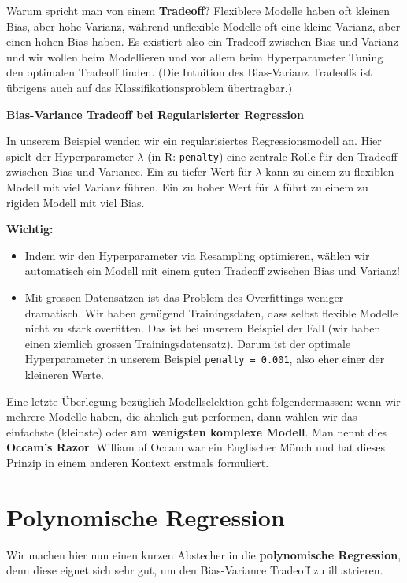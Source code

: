 \documentclass[
]{book}
\providecommand{\tightlist}{%
  \setlength{\itemsep}{0pt}\setlength{\parskip}{0pt}}
\begin{document}
Warum spricht man von einem \textbf{Tradeoff}? Flexiblere Modelle haben oft kleinen Bias, aber hohe Varianz, während unflexible Modelle oft eine kleine Varianz, aber einen hohen Bias haben. Es existiert also ein Tradeoff zwischen Bias und Varianz und wir wollen beim Modellieren und vor allem beim Hyperparameter Tuning den optimalen Tradeoff finden. (Die Intuition des Bias-Varianz Tradeoffs ist übrigens auch auf das Klassifikationsproblem übertragbar.)

\textbf{Bias-Variance Tradeoff bei Regularisierter Regression}

In unserem Beispiel wenden wir ein regularisiertes Regressionsmodell an. Hier spielt der Hyperparameter \(\lambda\) (in R: \texttt{penalty}) eine zentrale Rolle für den Tradeoff zwischen Bias und Variance. Ein zu tiefer Wert für \(\lambda\) kann zu einem zu flexiblen Modell mit viel Varianz führen. Ein zu hoher Wert für \(\lambda\) führt zu einem zu rigiden Modell mit viel Bias.

\textbf{Wichtig:}

\begin{itemize}
\tightlist
\item
  Indem wir den Hyperparameter via Resampling optimieren, wählen wir automatisch ein Modell mit einem guten Tradeoff zwischen Bias und Varianz!
\item
  Mit grossen Datensätzen ist das Problem des Overfittings weniger dramatisch. Wir haben genügend Trainingsdaten, dass selbst flexible Modelle nicht zu stark overfitten. Das ist bei unserem Beispiel der Fall (wir haben einen ziemlich grossen Trainingsdatensatz). Darum ist der optimale Hyperparameter in unserem Beispiel \texttt{penalty\ =\ 0.001}, also eher einer der kleineren Werte.
\end{itemize}

Eine letzte Überlegung bezüglich Modellselektion geht folgendermassen: wenn wir mehrere Modelle haben, die ähnlich gut performen, dann wählen wir das einfachste (kleinste) oder \textbf{am wenigsten komplexe Modell}. Man nennt dies \textbf{Occam's Razor}. William of Occam war ein Englischer Mönch und hat dieses Prinzip in einem anderen Kontext erstmals formuliert.

\hypertarget{polynomische-regression}{%
\section{Polynomische Regression}\label{polynomische-regression}}

Wir machen hier nun einen kurzen Abstecher in die \textbf{polynomische Regression}, denn diese eignet sich sehr gut, um den Bias-Variance Tradeoff zu illustrieren.
\end{document}
